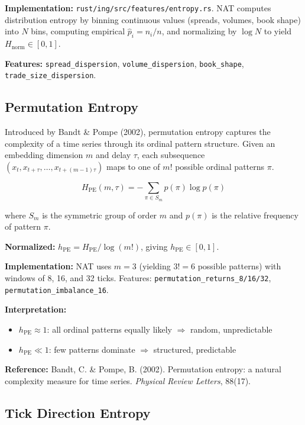 \documentclass[11pt,a4paper]{article}
\begin{document}
\textbf{Implementation:} \texttt{rust/ing/src/features/entropy.rs}. NAT computes distribution entropy by binning continuous values (spreads, volumes, book shape) into $N$ bins, computing empirical $\hat{p}_i = n_i / n$, and normalizing by $\log N$ to yield $H_{\text{norm}} \in [0, 1]$.

\textbf{Features:} \texttt{spread\_dispersion}, \texttt{volume\_dispersion}, \texttt{book\_shape}, \texttt{trade\_size\_dispersion}.

\subsection{Permutation Entropy}

Introduced by Bandt \& Pompe (2002), permutation entropy captures the complexity of a time series through its ordinal pattern structure. Given an embedding dimension $m$ and delay $\tau$, each subsequence $(x_t, x_{t+\tau}, \ldots, x_{t+(m-1)\tau})$ maps to one of $m!$ possible ordinal patterns $\pi$.

\begin{equation}
H_{\text{PE}}(m, \tau) = -\sum_{\pi \in S_m} p(\pi) \log p(\pi)
\end{equation}

where $S_m$ is the symmetric group of order $m$ and $p(\pi)$ is the relative frequency of pattern $\pi$.

\textbf{Normalized:} $h_{\text{PE}} = H_{\text{PE}} / \log(m!)$, giving $h_{\text{PE}} \in [0, 1]$.

\textbf{Implementation:} NAT uses $m = 3$ (yielding $3! = 6$ possible patterns) with windows of 8, 16, and 32 ticks. Features: \texttt{permutation\_returns\_8/16/32}, \texttt{permutation\_imbalance\_16}.

\textbf{Interpretation:}
\begin{itemize}
    \item $h_{\text{PE}} \approx 1$: all ordinal patterns equally likely $\Rightarrow$ random, unpredictable
    \item $h_{\text{PE}} \ll 1$: few patterns dominate $\Rightarrow$ structured, predictable
\end{itemize}

\textbf{Reference:} Bandt, C. \& Pompe, B. (2002). Permutation entropy: a natural complexity measure for time series. \textit{Physical Review Letters}, 88(17).

\subsection{Tick Direction Entropy}
\end{document}
